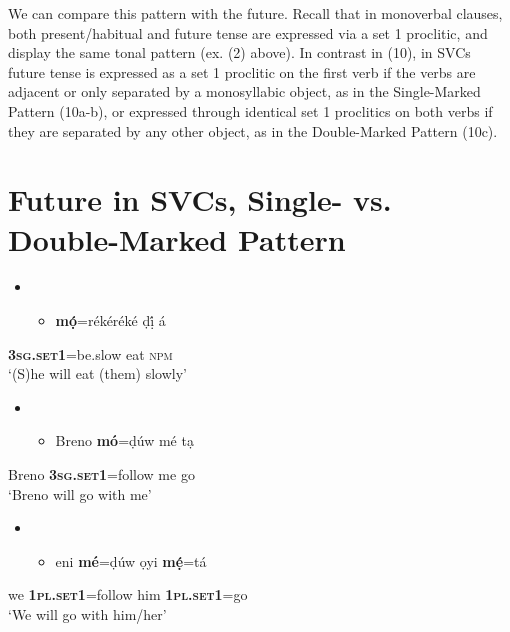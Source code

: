   We can compare this pattern with the future. Recall that in monoverbal clauses, both present/habitual and future tense are expressed via a set 1 proclitic, and display the same tonal pattern (ex. (2) above). In contrast in (10), in SVCs future tense is expressed as a set 1 proclitic on the first verb if the verbs are adjacent or only separated by a monosyllabic object, as in the Single-Marked Pattern (10a-b), or expressed through identical set 1 proclitics on both verbs if they are separated by any other object, as in the Double-Marked Pattern (10c). 

\chapter[Future in SVCs, Single{}- vs. Double{}-Marked Pattern]{Future in SVCs, Single- vs. Double-Marked Pattern}
\label{bkm:Ref453836224}\begin{itemize}
\item \setcounter{itemize}{0}
\begin{itemize}
\item \gll \textbf{mọ́}=rékéréké     ḍị́   á\\
\end{itemize}
\end{itemize}
     \textbf{\textsc{  3sg.set1}}=be.slow\textbf{ }  eat   \textsc{npm}\\
\glt ‘(S)he will eat (them) slowly’ 
\z

\begin{itemize}
\item \setcounter{itemize}{0}
\begin{itemize}
\item \gll Breno  \textbf{mó}=ḍúw       mé   tạ\\
\end{itemize}
\end{itemize}
       Breno   \textbf{\textsc{3sg.set1}}=follow    me  go\\
\glt ‘Breno will go with me’
\z

\begin{itemize}
\item \setcounter{itemize}{0}
\begin{itemize}
\item \gll eni   \textbf{mé}=ḍúw     ọyi    \textbf{mẹ́}=tá\\
\end{itemize}
\end{itemize}
       we   \textbf{\textsc{1pl.set1}}=follow  him    \textbf{\textsc{1pl.set1}}=go\\
\glt ‘We will go with him/her’
\z

